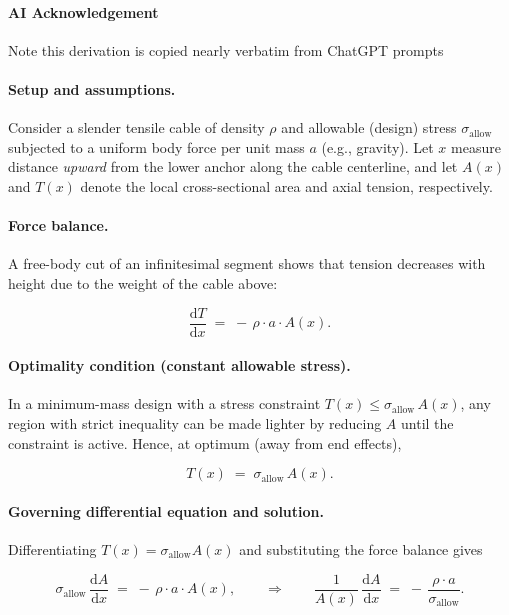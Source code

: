 \documentclass{article}
\begin{document}
\paragraph{AI Acknowledgement}
Note this derivation is copied nearly verbatim from ChatGPT prompts \cite{chatgpt}

\paragraph{Setup and assumptions.}
Consider a slender tensile cable of density \(\rho\) and allowable (design) stress \(\sigma_{\text{allow}}\) subjected to a uniform body force per unit mass \(a\) (e.g., gravity). Let \(x\) measure distance \emph{upward} from the lower anchor along the cable centerline, and let \(A(x)\) and \(T(x)\) denote the local cross-sectional area and axial tension, respectively.

\paragraph{Force balance.}
A free-body cut of an infinitesimal segment shows that tension decreases with height due to the weight of the cable above:


\[
\frac{\mathrm{d}T}{\mathrm{d}x} \;=\; -\,\rho \cdot a \cdot A(x).
\]



\paragraph{Optimality condition (constant allowable stress).}
In a minimum-mass design with a stress constraint \(T(x) \le \sigma_{\text{allow}}\,A(x)\), any region with strict inequality can be made lighter by reducing \(A\) until the constraint is active. Hence, at optimum (away from end effects),


\[
T(x) \;=\; \sigma_{\text{allow}} \, A(x).
\]



\paragraph{Governing differential equation and solution.}
Differentiating \(T(x)=\sigma_{\text{allow}} A(x)\) and substituting the force balance gives


\[
\sigma_{\text{allow}} \,\frac{\mathrm{d}A}{\mathrm{d}x} \;=\; -\,\rho \cdot a \cdot A(x),
\qquad\Rightarrow\qquad
\frac{1}{A(x)}\,\frac{\mathrm{d}A}{\mathrm{d}x} \;=\; -\,\frac{\rho \cdot a}{\sigma_{\text{allow}}}.
\]
\end{document}
